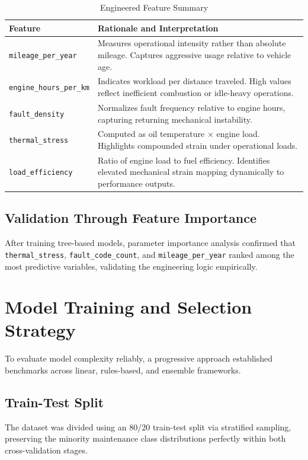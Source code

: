 \documentclass[12pt, a4paper]{article}
\begin{document}
\begin{table}[H]
\centering
\caption{Engineered Feature Summary}
\begin{tabularx}{\textwidth}{lX}
\toprule
\textbf{Feature} & \textbf{Rationale and Interpretation} \\
\midrule
\texttt{mileage\_per\_year} & Measures operational intensity rather than absolute mileage. Captures aggressive usage relative to vehicle age. \\
\texttt{engine\_hours\_per\_km} & Indicates workload per distance traveled. High values reflect inefficient combustion or idle-heavy operations. \\
\texttt{fault\_density} & Normalizes fault frequency relative to engine hours, capturing returning mechanical instability. \\
\texttt{thermal\_stress} & Computed as oil temperature $\times$ engine load. Highlights compounded strain under operational loads. \\
\texttt{load\_efficiency} & Ratio of engine load to fuel efficiency. Identifies elevated mechanical strain mapping dynamically to performance outputs. \\
\bottomrule
\end{tabularx}
\end{table}

\subsection{Validation Through Feature Importance}

After training tree-based models, parameter importance analysis confirmed that \texttt{thermal\_stress}, \texttt{fault\_code\_count}, and \texttt{mileage\_per\_year} ranked among the most predictive variables, validating the engineering logic empirically.

\newpage
\section{Model Training and Selection Strategy}

To evaluate model complexity reliably, a progressive approach established benchmarks across linear, rules-based, and ensemble frameworks. 

\subsection{Train-Test Split}

The dataset was divided using an 80/20 train-test split via stratified sampling, preserving the minority maintenance class distributions perfectly within both cross-validation stages.
\end{document}
